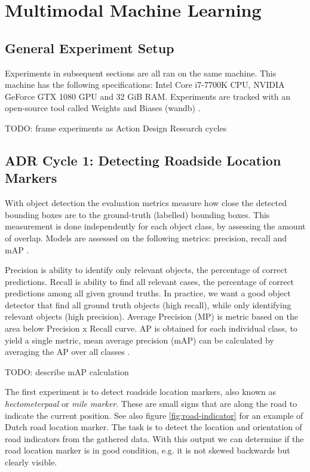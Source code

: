 \clearpage
\section{Multimodal Machine Learning}


\subsection{General Experiment Setup}
Experiments in subsequent sections are all ran on the same machine. This machine has the following specifications: Intel Core i7-7700K CPU, NVIDIA GeForce GTX 1080 GPU and 32 GiB RAM. Experiments are tracked with an open-source tool called Weights and Biases (wandb) \cite{wandb}.

TODO: frame experiments as Action Design Research cycles


\subsection{ADR Cycle 1: Detecting Roadside Location Markers}

With object detection the evaluation metrics measure how close the detected bounding boxes are to the ground-truth (labelled) bounding boxes. This measurement is done independently for each object class, by assessing the amount of overlap. Models are assessed on the following metrics: precision, recall and mAP \cite{Padilla2021}.

Precision is ability to identify only relevant objects, the percentage of correct predictions. Recall is ability to find all relevant cases, the percentage of correct predictions among all given ground truths. In practice, we want a good object detector that find all ground truth objects (high recall), while only identifying relevant objects (high precision). Average Precision (MP) is metric based on the area below Precision x Recall curve. AP is obtained for each individual class, to yield a single metric, mean average precision (mAP) can be calculated by averaging the AP over all classes \cite{Padilla2021}.

TODO: describe mAP calculation

The first experiment is to detect roadside location markers, also known as \textit{hectometerpaal} or \textit{mile marker}. These are  small signs that are along the road to indicate the current position. See also figure \ref{fig:road-indicator} for an example of Dutch road location marker. The task is to detect the location and orientation of road indicators from the gathered data. With this output we can determine if the road location marker is in good condition, e.g. it is not skewed backwards but clearly visible.

